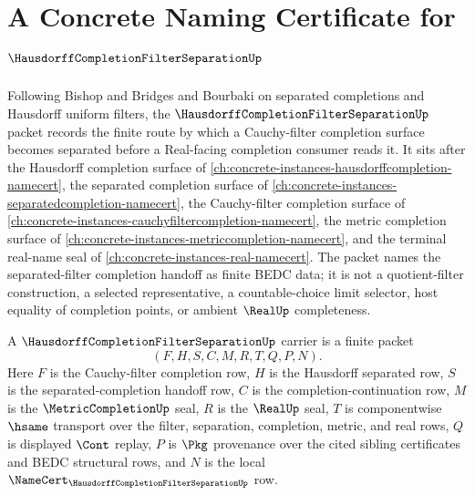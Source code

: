 \chapter{A Concrete Naming Certificate for $\HausdorffCompletionFilterSeparationUp$}
\label{ch:concrete-instances-hausdorff-completion-filter-separation-namecert}

Following Bishop and Bridges and Bourbaki on separated completions and Hausdorff uniform filters, the $\HausdorffCompletionFilterSeparationUp$ packet records the finite route by which a Cauchy-filter completion surface becomes separated before a Real-facing completion consumer reads it. It sits after the Hausdorff completion surface of \autoref{ch:concrete-instances-hausdorffcompletion-namecert}, the separated completion surface of \autoref{ch:concrete-instances-separatedcompletion-namecert}, the Cauchy-filter completion surface of \autoref{ch:concrete-instances-cauchyfiltercompletion-namecert}, the metric completion surface of \autoref{ch:concrete-instances-metriccompletion-namecert}, and the terminal real-name seal of \autoref{ch:concrete-instances-real-namecert}. The packet names the separated-filter completion handoff as finite BEDC data; it is not a quotient-filter construction, a selected representative, a countable-choice limit selector, host equality of completion points, or ambient $\RealUp$ completeness.

\begin{definition}
\label{def:hausdorff-completion-filter-separation-carrier}
A $\HausdorffCompletionFilterSeparationUp$ carrier is a finite packet
$$
(F,H,S,C,M,R,T,Q,P,N).
$$
Here $F$ is the Cauchy-filter completion row, $H$ is the Hausdorff separated row, $S$ is the separated-completion handoff row, $C$ is the completion-continuation row, $M$ is the $\MetricCompletionUp$ seal, $R$ is the $\RealUp$ seal, $T$ is componentwise $\hsame$ transport over the filter, separation, completion, metric, and real rows, $Q$ is displayed $\Cont$ replay, $P$ is $\Pkg$ provenance over the cited sibling certificates and BEDC structural rows, and $N$ is the local $\NameCert_{\HausdorffCompletionFilterSeparationUp}$ row.
\end{definition}

